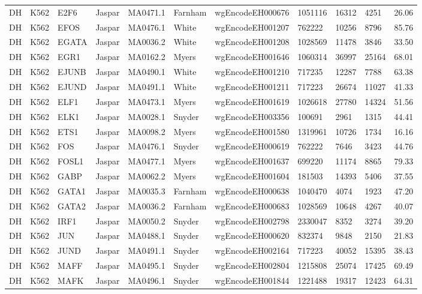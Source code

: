 {\begin{longtable}{p{0.2cm}p{1.1cm}p{1.0cm}p{1.0cm}p{1.0cm}p{1.0cm}p{2.3cm}p{1.0cm}p{0.8cm}p{0.8cm}p{0.8cm}}
DH & K562 & E2F6 & Jaspar & MA0471.1 & Farnham & wgEncodeEH000676 & 1051116 & 16312 & 4251 & 26.06\\
DH & K562 & EFOS & Jaspar & MA0476.1 & White & wgEncodeEH001207 & 762222 & 10256 & 8796 & 85.76\\
DH & K562 & EGATA & Jaspar & MA0036.2 & White & wgEncodeEH001208 & 1028569 & 11478 & 3846 & 33.50\\
DH & K562 & EGR1 & Jaspar & MA0162.2 & Myers & wgEncodeEH001646 & 1060314 & 36997 & 25164 & 68.01\\
DH & K562 & EJUNB & Jaspar & MA0490.1 & White & wgEncodeEH001210 & 717235 & 12287 & 7788 & 63.38\\
DH & K562 & EJUND & Jaspar & MA0491.1 & White & wgEncodeEH001211 & 717223 & 26674 & 11027 & 41.33\\
DH & K562 & ELF1 & Jaspar & MA0473.1 & Myers & wgEncodeEH001619 & 1026618 & 27780 & 14324 & 51.56\\
DH & K562 & ELK1 & Jaspar & MA0028.1 & Snyder & wgEncodeEH003356 & 100691 & 2961 & 1315 & 44.41\\
DH & K562 & ETS1 & Jaspar & MA0098.2 & Myers & wgEncodeEH001580 & 1319961 & 10726 & 1734 & 16.16\\
DH & K562 & FOS & Jaspar & MA0476.1 & Snyder & wgEncodeEH000619 & 762222 & 7646 & 3423 & 44.76\\
DH & K562 & FOSL1 & Jaspar & MA0477.1 & Myers & wgEncodeEH001637 & 699220 & 11174 & 8865 & 79.33\\
DH & K562 & GABP & Jaspar & MA0062.2 & Myers & wgEncodeEH001604 & 181503 & 14393 & 5406 & 37.55\\
DH & K562 & GATA1 & Jaspar & MA0035.3 & Farnham & wgEncodeEH000638 & 1040470 & 4074 & 1923 & 47.20\\
DH & K562 & GATA2 & Jaspar & MA0036.2 & Farnham & wgEncodeEH000683 & 1028569 & 10648 & 4267 & 40.07\\
DH & K562 & IRF1 & Jaspar & MA0050.2 & Snyder & wgEncodeEH002798 & 2330047 & 8352 & 3274 & 39.20\\
DH & K562 & JUN & Jaspar & MA0488.1 & Snyder & wgEncodeEH000620 & 832374 & 9848 & 2150 & 21.83\\
DH & K562 & JUND & Jaspar & MA0491.1 & Snyder & wgEncodeEH002164 & 717223 & 40052 & 15395 & 38.43\\
DH & K562 & MAFF & Jaspar & MA0495.1 & Snyder & wgEncodeEH002804 & 1215808 & 25074 & 17425 & 69.49\\
DH & K562 & MAFK & Jaspar & MA0496.1 & Snyder & wgEncodeEH001844 & 1221488 & 19317 & 12423 & 64.31\\

\end{longtable}}
